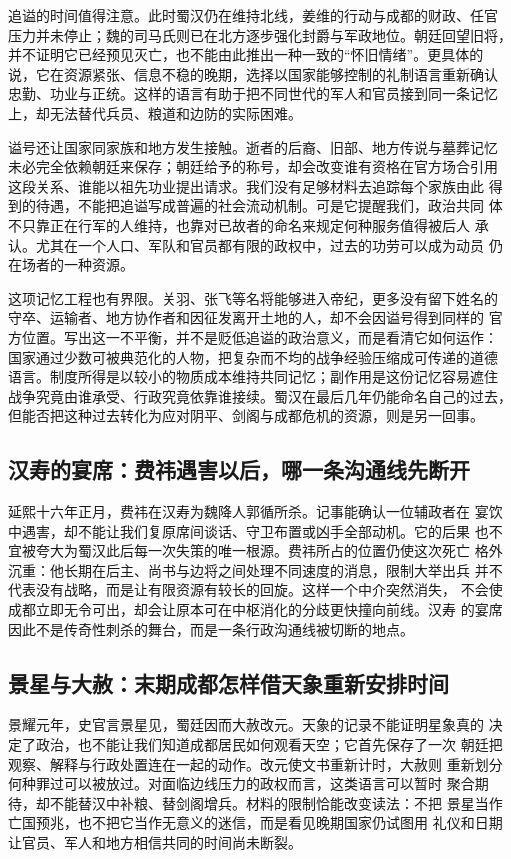 追谥的时间值得注意。此时蜀汉仍在维持北线，姜维的行动与成都的财政、任官
压力并未停止；魏的司马氏则已在北方逐步强化封爵与军政地位。朝廷回望旧将，
并不证明它已经预见灭亡，也不能由此推出一种一致的“怀旧情绪”。更具体的
说，它在资源紧张、信息不稳的晚期，选择以国家能够控制的礼制语言重新确认
忠勤、功业与正统。这样的语言有助于把不同世代的军人和官员接到同一条记忆
上，却无法替代兵员、粮道和边防的实际困难。

谥号还让国家同家族和地方发生接触。逝者的后裔、旧部、地方传说与墓葬记忆
未必完全依赖朝廷来保存；朝廷给予的称号，却会改变谁有资格在官方场合引用
这段关系、谁能以祖先功业提出请求。我们没有足够材料去追踪每个家族由此
得到的待遇，不能把追谥写成普遍的社会流动机制。可是它提醒我们，政治共同
体不只靠正在行军的人维持，也靠对已故者的命名来规定何种服务值得被后人
承认。尤其在一个人口、军队和官员都有限的政权中，过去的功劳可以成为动员
仍在场者的一种资源。

这项记忆工程也有界限。关羽、张飞等名将能够进入帝纪，更多没有留下姓名的
守卒、运输者、地方协作者和因征发离开土地的人，却不会因谥号得到同样的
官方位置。写出这一不平衡，并不是贬低追谥的政治意义，而是看清它如何运作：
国家通过少数可被典范化的人物，把复杂而不均的战争经验压缩成可传递的道德
语言。制度所得是以较小的物质成本维持共同记忆；副作用是这份记忆容易遮住
战争究竟由谁承受、行政究竟依靠谁接续。蜀汉在最后几年仍能命名自己的过去，
但能否把这种过去转化为应对阴平、剑阁与成都危机的资源，则是另一回事。

\subsection{汉寿的宴席：费祎遇害以后，哪一条沟通线先断开}

延熙十六年正月，费祎在汉寿为魏降人郭循所杀。记事能确认一位辅政者在
宴饮中遇害，却不能让我们复原席间谈话、守卫布置或凶手全部动机。它的后果
也不宜被夸大为蜀汉此后每一次失策的唯一根源。费祎所占的位置仍使这次死亡
格外沉重：他长期在后主、尚书与边将之间处理不同速度的消息，限制大举出兵
并不代表没有战略，而是让有限资源有较长的回旋。这样一个中介突然消失，
不会使成都立即无令可出，却会让原本可在中枢消化的分歧更快撞向前线。汉寿
的宴席因此不是传奇性刺杀的舞台，而是一条行政沟通线被切断的地点。

\subsection{景星与大赦：末期成都怎样借天象重新安排时间}

景耀元年，史官言景星见，蜀廷因而大赦改元。天象的记录不能证明星象真的
决定了政治，也不能让我们知道成都居民如何观看天空；它首先保存了一次
朝廷把观察、解释与行政处置连在一起的动作。改元使文书重新计时，大赦则
重新划分何种罪过可以被放过。对面临边线压力的政权而言，这类语言可以暂时
聚合期待，却不能替汉中补粮、替剑阁增兵。材料的限制恰能改变读法：不把
景星当作亡国预兆，也不把它当作无意义的迷信，而是看见晚期国家仍试图用
礼仪和日期让官员、军人和地方相信共同的时间尚未断裂。
